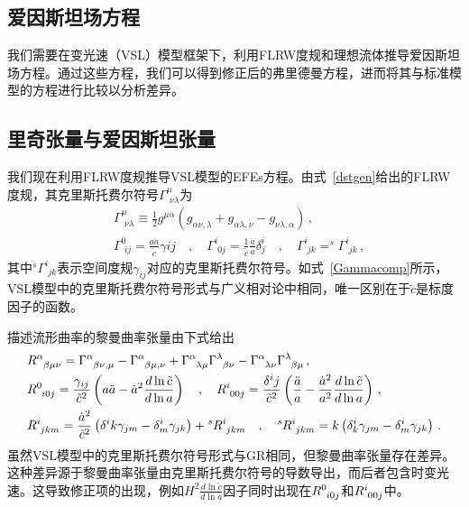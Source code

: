 \documentclass[jkps,preprint,fleqn]{revtex4}
\newcommand{\tc}{\tilde{c}}
\begin{document}
\begin{CJK*}{UTF8}{gbsn}
\section{爱因斯坦场方程} \label{sec:EFEs}

我们需要在变光速（VSL）模型框架下，利用FLRW度规和理想流体推导爱因斯坦场方程。通过这些方程，我们可以得到修正后的弗里德曼方程，进而将其与标准模型的方程进行比较以分析差异。
\subsection{里奇张量与爱因斯坦张量}\label{subsec:RS}
我们现在利用FLRW度规推导VSL模型的EFEs方程\cite{Lee:2020zts,Lee:2025rpw}。由式~\eqref{dstgen}给出的FLRW度规，其克里斯托费尔符号$\Gamma^{\mu}_{\,\,\nu\lambda}$为
\begin{align}
&\Gamma^{\mu}_{\,\,\nu\lambda} \equiv \frac{1}{2} g^{\mu\alpha} \left( g_{\alpha\nu,\lambda} + g_{\alpha\lambda,\nu} - g_{\nu\lambda,\alpha} \right) \label{Gamma}\,, \\ &\Gamma^{0}_{\,\,ij} = \frac{a\dot{a}}{\tc} \gamma{ij} \quad , \quad \Gamma^{i}_{\,\,0j} = \frac{1}{\tc}  \frac{\dot{a}}{a} \delta^i_j \quad , \quad \Gamma^{i}_{\,\,jk} = ^{s}\Gamma^{i}_{\,\,jk}  \label{Gammacomp} \,, \end{align}
其中$^{s}\Gamma^{i}_{\,\,jk}$表示空间度规$\gamma_{ij}$对应的克里斯托费尔符号。如式~\eqref{Gammacomp}所示，VSL模型中的克里斯托费尔符号形式与广义相对论中相同，唯一区别在于$\tc$是标度因子的函数。

描述流形曲率的黎曼曲率张量由下式给出
\begin{align}
&\tensor{R}{^\alpha_\beta_\mu_\nu} = \tensor{\Gamma}{^\alpha_\beta_\nu_,_\mu} - \tensor{\Gamma}{^\alpha_\beta_\mu_,_\nu} + \tensor{\Gamma}{^\alpha_\lambda_\mu} \tensor{\Gamma}{^\lambda_\beta_\nu} - \tensor{\Gamma}{^\alpha_\lambda_\nu} \tensor{\Gamma}{^\lambda_\beta_\mu} \label{Rabmu} \,, \\ &\tensor{R}{^0_i_0_j} = \frac{\gamma_{ij}}{\tc^2} \left( a \ddot{a} - \dot{a}^2 \frac{d \ln \tc}{d \ln a} \right) \quad , \quad \tensor{R}{^i_0_0_j} = \frac{\delta^{i}{j}}{\tc^2} \left( \frac{\ddot{a}}{a} - \frac{\dot{a}^2}{a^2} \frac{d \ln \tc}{ d \ln a}  \right) \,, \label{R0i0j} \\ &\tensor{R}{^i_j_k_m} = \frac{\dot{a}^2}{\tc^2} \left( \delta^{i}{k} \gamma_{jm} - \delta^i_m \gamma_{jk} \right) + \tensor[^s]{R}{^i_j_k_m} \quad , \quad \tensor[^s]{R}{^i_j_k_m} = k \left( \delta^i_k \gamma_{jm} - \delta^i_m \gamma_{jk} \right) \,. \label{Rijkm} \end{align}
虽然VSL模型中的克里斯托费尔符号形式与GR相同，但黎曼曲率张量存在差异。这种差异源于黎曼曲率张量由克里斯托费尔符号的导数导出，而后者包含时变光速。这导致修正项的出现，例如$H^2 \frac{d \ln \tc}{d \ln a}$因子同时出现在$\tensor{R}{^0_i_0_j}$和$\tensor{R}{^i_0_0_j}$中。


\end{CJK*}
\end{document}
